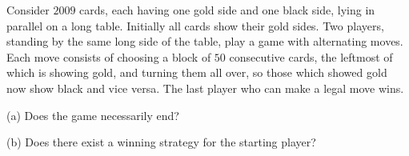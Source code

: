 Consider $2009$ cards, each having one gold side and one black side, lying in parallel on a long table. Initially all cards show their gold sides. Two players, standing by the same long side of the table, play a game with alternating moves. Each move consists of choosing a block of $50$ consecutive cards, the leftmost of which is showing gold, and turning them all over, so those which showed gold now show black and vice versa. The last player who can make a legal move wins.

(a) Does the game necessarily end?

(b) Does there exist a winning strategy for the starting player?
